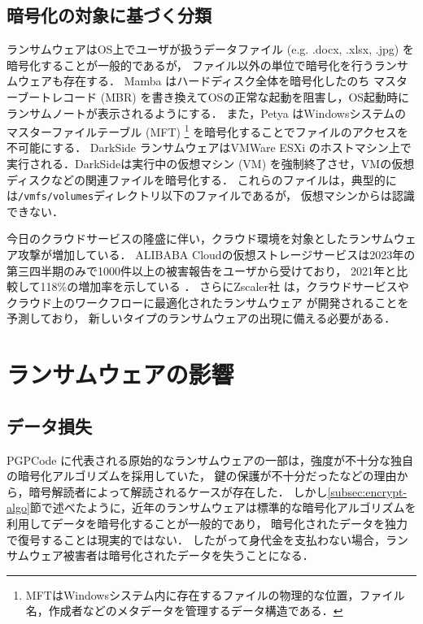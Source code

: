 \subsection{暗号化の対象に基づく分類}
ランサムウェアはOS上でユーザが扱うデータファイル (e.g. .docx, .xlsx, .jpg) を暗号化することが一般的であるが，
ファイル以外の単位で暗号化を行うランサムウェアも存在する．
Mamba \cite{mamba-petya} はハードディスク全体を暗号化したのち
マスターブートレコード (MBR) を書き換えてOSの正常な起動を阻害し，OS起動時にランサムノートが表示されるようにする．
また，Petya \cite{mamba-petya} はWindowsシステムのマスターファイルテーブル (MFT)
\footnote{MFTはWindowsシステム内に存在するファイルの物理的な位置，ファイル名，作成者などのメタデータを管理するデータ構造である．}
を暗号化することでファイルのアクセスを不可能にする．
DarkSide \cite{DarkSide42:online} ランサムウェアはVMWare ESXi \cite{VMwarevS52:online}
のホストマシン上で実行される．DarkSideは実行中の仮想マシン (VM) を強制終了させ，VMの仮想ディスクなどの関連ファイルを暗号化する．
これらのファイルは，典型的には\texttt{/vmfs/volumes}ディレクトリ以下のファイルであるが，
仮想マシンからは認識できない．

今日のクラウドサービスの隆盛に伴い，クラウド環境を対象としたランサムウェア攻撃が増加している．
ALIBABA Cloudの仮想ストレージサービスは2023年の第三四半期のみで1000件以上の被害報告をユーザから受けており，
2021年と比較して118\%の増加率を示している \cite{wang2024ransom}．
さらにZscaler社  は，クラウドサービスやクラウド上のワークフローに最適化されたランサムウェア
が開発されることを予測\cite{zscaler-ransomware}しており，
新しいタイプのランサムウェアの出現に備える必要がある．

\section{ランサムウェアの影響}
\subsection{データ損失}
PGPCode \cite{PGPCoder42:online}に代表される原始的なランサムウェアの一部は，強度が不十分な独自の暗号化アルゴリズムを採用していた，
鍵の保護が不十分だったなどの理由から，暗号解読者によって解読されるケースが存在した．
しかし\ref{subsec:encrypt-algo}節で述べたように，近年のランサムウェアは標準的な暗号化アルゴリズムを利用してデータを暗号化することが一般的であり，
暗号化されたデータを独力で復号することは現実的ではない．
したがって身代金を支払わない場合，ランサムウェア被害者は暗号化されたデータを失うことになる．

